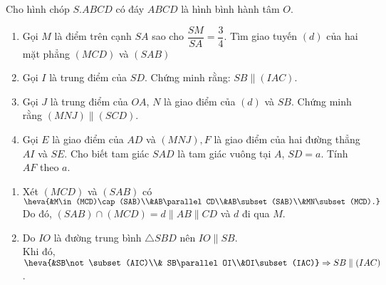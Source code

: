 \begin{ex}%
Cho hình chóp $S.ABCD$ có đáy $ABCD$ là hình bình hành tâm $O$.
\begin{enumerate}
\item  Gọi $M$ là điểm trên cạnh $SA$ sao cho $\dfrac{SM}{SA}=\dfrac{3}{4}$. Tìm giao tuyến $(d)$ của hai mặt phẳng $(MCD)$ và $(SAB)$
\item  Gọi $I$ là trung điểm của $SD$. Chứng minh rằng: $SB\parallel (IAC)$.
\item  Gọi $J$ là trung điểm của $OA$, $N$ là giao điểm của $(d)$ và $SB$. Chứng minh rằng $(MNJ)\parallel (SCD)$.
\item  Gọi $E$ là giao điểm của $AD$ và $(MNJ), F$ là giao điểm của hai đường thẳng $AI$ và $SE$. Cho biết tam giác $SAD$ là tam giác vuông tại $A$, $SD=a$. Tính $AF$ theo $a$.
\end{enumerate}
\loigiai
{
\begin{center}
\end{center}
\begin{enumerate}
\item Xét $(MCD)$ và $(SAB)$ có $\heva{&M\in (MCD)\cap (SAB)\\&AB\parallel CD\\&AB\subset (SAB)\\&MN\subset (MCD).}$\\
Do đó, $(SAB)\cap (MCD)=d\parallel AB\parallel CD$ và $d$ đi qua $M$.
\item Do $IO$ là đường trung bình $\triangle SBD$ nên $IO\parallel SB$.\\
Khi đó, $\heva{&SB\not\subset (AIC)\\& SB\parallel OI\\&OI\subset (IAC)}\Rightarrow SB\parallel (IAC)$.

\end{enumerate}}
\end{ex}
